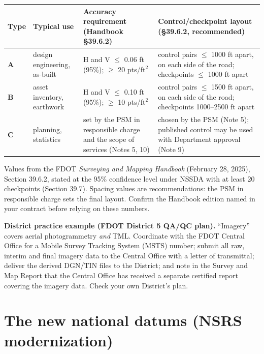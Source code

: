 \begin{center}\small
\renewcommand{\arraystretch}{1.3}
\begin{tabularx}{\linewidth}{>{\bfseries}p{0.9cm}>{\raggedright\arraybackslash}p{3.0cm}>{\raggedright\arraybackslash}X>{\raggedright\arraybackslash}X}\toprule
Type & Typical use & Accuracy requirement (Handbook §39.6.2) & Control/checkpoint layout (§39.6.2, recommended)\\\midrule
A & design engineering, as-built & H and V $\le$ 0.06 ft (95\%); $\ge$ 20 pts/ft$^2$ & control pairs $\le$ 1000 ft apart, on each side of the road; checkpoints $\le$ 1000 ft apart\\
B & asset inventory, earthwork & H and V $\le$ 0.10 ft (95\%); $\ge$ 10 pts/ft$^2$ & control pairs $\le$ 1500 ft apart, on each side of the road; checkpoints 1000--2500 ft apart\\
C & planning, statistics & set by the PSM in responsible charge and the scope of services (Notes 5, 10) & chosen by the PSM (Note 5); published control may be used with Department approval (Note 9)\\\bottomrule
\end{tabularx}\end{center}
{\footnotesize Values from the FDOT \emph{Surveying and Mapping Handbook} (February 28, 2025), Section 39.6.2, stated at the 95\% confidence level under NSSDA with at least 20 checkpoints (Section 39.7). Spacing values are recommendations: the PSM in responsible charge sets the final layout. Confirm the Handbook edition named in your contract before relying on these numbers.}

\begin{tip}
\textbf{District practice example (FDOT District 5 QA/QC plan).} ``Imagery'' covers aerial photogrammetry \emph{and} TML. Coordinate with the FDOT Central Office for a Mobile Survey Tracking System (MSTS) number; submit all raw, interim and final imagery data to the Central Office with a letter of transmittal; deliver the derived DGN/TIN files to the District; and note in the Survey and Map Report that the Central Office has received a separate certified report covering the imagery data. Check your own District's plan.
\end{tip}

\section{The new national datums (NSRS modernization)}\label{sec:nsrs}

